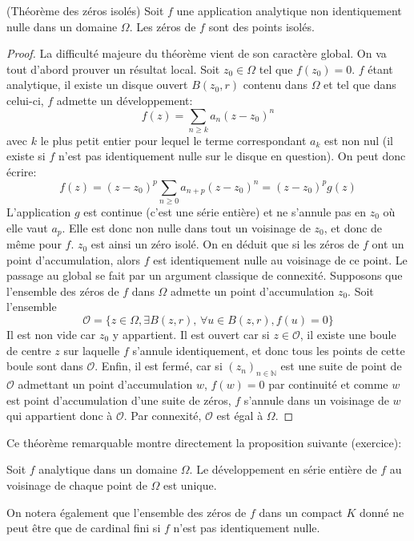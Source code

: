 \begin{fthm}(Théorème des zéros isolés)
Soit $f$ une application analytique non identiquement nulle dans un domaine
$\Omega$. Les zéros de $f$ sont des points isolés.
\end{fthm}
\begin{proof}
La difficulté majeure du théorème vient de son caractère global. On va tout
d'abord prouver un résultat local. 
Soit $z_0 \in \Omega$ tel que $f(z_0)=0$. $f$
étant analytique, il existe un disque ouvert $B(z_0,r)$ contenu dans $\Omega$ 
et tel que dans celui-ci, $f$
admette un développement:
\[f(z)= \sum_{n \geq k}a_n (z-z_0)^n\]
avec $k$ le plus petit entier pour lequel le terme correspondant $a_k$ est non
nul (il existe si $f$ n'est pas identiquement nulle sur le disque en question).
On peut donc écrire:
\[
f(z)=(z-z_0)^p\sum_{n \geq 0}a_{n+p}(z-z_0)^n=(z-z_0)^p g(z)
\] 
L'application $g$ est continue (c'est une série entière) et ne s'annule pas en
$z_0$ où elle vaut $a_p$. Elle est donc non nulle dans tout un voisinage de
$z_0$, et donc de même pour $f$. $z_0$ est ainsi un zéro isolé. On en déduit que
si les zéros de $f$ ont un point d'accumulation, alors $f$ est identiquement
nulle au voisinage de ce point.
Le passage au global se fait par un argument
classique de connexité. Supposons que l'ensemble des zéros de $f$ dans
$\Omega$ admette un point d'accumulation $z_0$. Soit l'ensemble
\[
\mathcal{O}=\{z\in \Omega, \exists B(z,r), \, \forall u \in B(z,r), f(u)=0 \} 
\]
Il est non vide car $z_0$ y appartient. Il est ouvert car si $z \in
\mathcal{O}$, il existe une boule de centre $z$ sur laquelle $f$ s'annule
identiquement, et donc tous les points de cette boule sont dans $\mathcal{O}$.
Enfin, il est fermé, car si $(z_n)_{n\in \mathbb{N}}$ est une suite de point de
$\mathcal{O}$ admettant un point d'accumulation $w$, $f(w)=0$ par continuité et
comme $w$ est point d'accumulation d'une suite de zéros, $f$ s'annule dans un
voisinage de $w$ qui appartient donc à $\mathcal{O}$. Par connexité,
$\mathcal{O}$ est égal à $\Omega$.
\end{proof}
Ce théorème remarquable montre directement la proposition suivante
(exercice):

\begin{fprop}
Soit $f$ analytique dans un domaine $\Omega$. Le développement en série entière
de $f$ au voisinage de chaque point de $\Omega$ est unique.
\end{fprop}


On notera également que l'ensemble des zéros de $f$ dans un compact $K$ donné ne
peut être que de cardinal fini si $f$ n'est pas identiquement nulle.

